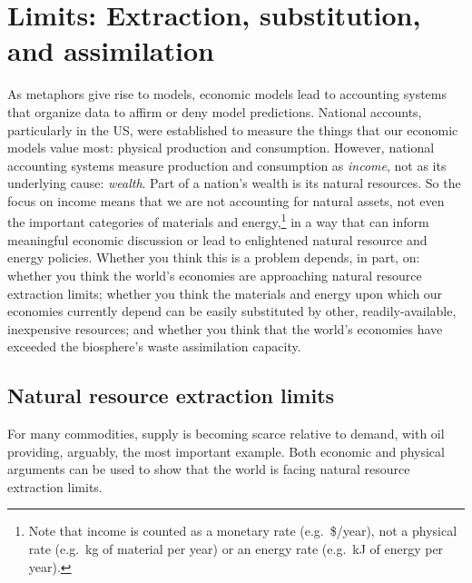 \section{Limits: Extraction, substitution, and assimilation}
\label{sec:limits}

As metaphors give rise to models, 
economic models lead to accounting systems that organize data
to affirm or deny model predictions.
National accounts, 
particularly in the US, 
were established to measure the things that 
our economic models value most: 
physical production and consumption. 
However, national accounting systems measure production and consumption 
as \emph{income}, not as its underlying cause: \emph{wealth}.
Part of a nation's wealth is its natural resources.
So the focus on income means that we are not accounting for natural assets, 
not even the important categories of materials and energy,\footnote{Note that
	income is counted as a monetary rate (e.g.\ \$/year), 
	not a physical rate (e.g.\ kg of material per year)
	or an energy rate (e.g.\ kJ of energy per year).} 
in a way that can inform meaningful economic discussion or
lead to enlightened natural resource and energy policies.
Whether you think this is a problem depends, in part, on:
whether you think the world's economies are approaching 
	natural resource extraction limits;
whether you think the materials and energy upon which our economies currently depend
	can be easily substituted by other, readily-available, inexpensive resources; and
whether you think that the world's economies have exceeded 
	the biosphere's waste assimilation capacity.


\subsection{Natural resource extraction limits}
\label{sub:natural_resource_extraction_limits}

For many commodities, 
supply is becoming scarce relative to demand, 
with oil providing, arguably, the most important example. 
Both economic and physical arguments can be used to show that the world is facing
natural resource extraction limits.


